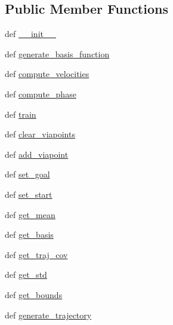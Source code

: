 \subsection*{Public Member Functions}
\begin{DoxyCompactItemize}
\item 
def \hyperlink{classaml__lfd_1_1promp_1_1discrete__promp_1_1_discrete_p_r_o_m_p_a08411e5267252063f4ba35a92e445ddc}{\-\_\-\-\_\-init\-\_\-\-\_\-}
\item 
def \hyperlink{classaml__lfd_1_1promp_1_1discrete__promp_1_1_discrete_p_r_o_m_p_a07b41a1e58a98d21e5155e8bd45e4e26}{generate\-\_\-basis\-\_\-function}
\item 
def \hyperlink{classaml__lfd_1_1promp_1_1discrete__promp_1_1_discrete_p_r_o_m_p_a00cdc1d700fafc8db39d2f484840f5d1}{compute\-\_\-velocities}
\item 
def \hyperlink{classaml__lfd_1_1promp_1_1discrete__promp_1_1_discrete_p_r_o_m_p_a4c1ab83285199db2e6188fbd85d11a0e}{compute\-\_\-phase}
\item 
def \hyperlink{classaml__lfd_1_1promp_1_1discrete__promp_1_1_discrete_p_r_o_m_p_a55545a68c0418bea39eee31df54ee0c7}{train}
\item 
def \hyperlink{classaml__lfd_1_1promp_1_1discrete__promp_1_1_discrete_p_r_o_m_p_a3f8d736f60febfdf772a90340a94582c}{clear\-\_\-viapoints}
\item 
def \hyperlink{classaml__lfd_1_1promp_1_1discrete__promp_1_1_discrete_p_r_o_m_p_ab41b4ebd38a88c17f04d92e075aa4e76}{add\-\_\-viapoint}
\item 
def \hyperlink{classaml__lfd_1_1promp_1_1discrete__promp_1_1_discrete_p_r_o_m_p_a4d1dffa6b93c4cea9c1e90a902b08a38}{set\-\_\-goal}
\item 
def \hyperlink{classaml__lfd_1_1promp_1_1discrete__promp_1_1_discrete_p_r_o_m_p_a7d84714c297e799717a4d92191f53f7a}{set\-\_\-start}
\item 
def \hyperlink{classaml__lfd_1_1promp_1_1discrete__promp_1_1_discrete_p_r_o_m_p_a34bb1e437a4aa0271cab9a8f3733a2a4}{get\-\_\-mean}
\item 
def \hyperlink{classaml__lfd_1_1promp_1_1discrete__promp_1_1_discrete_p_r_o_m_p_a61802fea334535438035e4a685ef29a4}{get\-\_\-basis}
\item 
def \hyperlink{classaml__lfd_1_1promp_1_1discrete__promp_1_1_discrete_p_r_o_m_p_a1a80594ca104447d509bb9a3b62c8b34}{get\-\_\-traj\-\_\-cov}
\item 
def \hyperlink{classaml__lfd_1_1promp_1_1discrete__promp_1_1_discrete_p_r_o_m_p_a76dec38525688cece31b6c6131f264f2}{get\-\_\-std}
\item 
def \hyperlink{classaml__lfd_1_1promp_1_1discrete__promp_1_1_discrete_p_r_o_m_p_ad076683586a6ccc1900180d6a481bd55}{get\-\_\-bounds}
\item 
def \hyperlink{classaml__lfd_1_1promp_1_1discrete__promp_1_1_discrete_p_r_o_m_p_a9cf60d83ce2014e1d595951f9c4e349d}{generate\-\_\-trajectory}
\end{DoxyCompactItemize}


